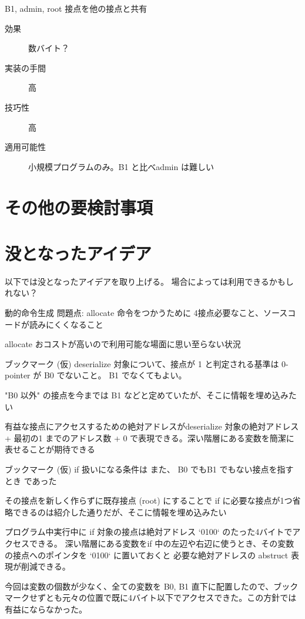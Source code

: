 \documentclass[12pt,unicode]{beamer}
\begin{document}
\begin{frame}{B1, admin, root 接点を他の接点と共有}
   \begin{description}
      \item[効果] 数バイト？
      \item[実装の手間] 高
      \item[技巧性] 高
      \item[適用可能性] 小規模プログラムのみ。B1 と比べadmin は難しい
   \end{description}
\end{frame}

\section{その他の要検討事項}
\begin{frame}

\end{frame}

\section{没となったアイデア}
\begin{frame}
   以下では没となったアイデアを取り上げる。
   場合によっては利用できるかもしれない？
\end{frame}

\begin{frame}{動的命令生成}
   問題点: allocate 命令をつかうために 4接点必要なこと、ソースコードが読みにくくなること

   allocate おコストが高いので利用可能な場面に思い至らない状況
\end{frame}

\begin{frame}{ブックマーク (仮)}
   deserialize 対象について、接点が 1 と判定される基準は 0-pointer が B0 でないこと。
   B1 でなくてもよい。

   "B0 以外" の接点を今までは B1 などと定めていたが、そこに情報を埋め込みたい

   有益な接点にアクセスするための絶対アドレスがdeserialize 対象の絶対アドレス + 最初の1 までのアドレス数 + 0 で表現できる。深い階層にある変数を簡潔に表せることが期待できる
\end{frame}

\begin{frame}{ブックマーク (仮)}
   if 扱いになる条件は また、 B0 でもB1 でもない接点を指すとき であった

   その接点を新しく作らずに既存接点 (root) にすることで if に必要な接点が1つ省略できるのは紹介した通りだが、そこに情報を埋め込みたい

   プログラム中実行中に if 対象の接点は絶対アドレス  `0100` のたった4バイトでアクセスできる。
   深い階層にある変数をif 中の左辺や右辺に使うとき、その変数の接点へのポインタを `0100` に置いておくと 必要な絶対アドレスの abstruct 表現が削減できる。

   今回は変数の個数が少なく、全ての変数を B0, B1 直下に配置したので、ブックマークせずとも元々の位置で既に4バイト以下でアクセスできた。この方針では有益にならなかった。
\end{frame}
\end{document}
